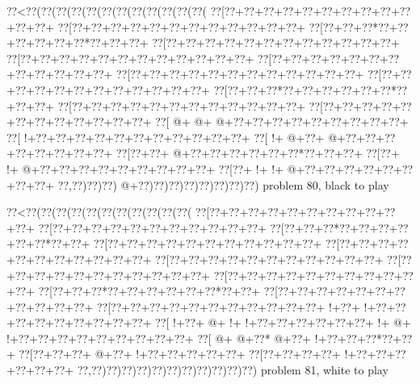 \vbox{\vbox{\goo
\0??<\0??(\0??(\0??(\0??(\0??(\0??(\0??(\0??(\0??(\0??(\0??(\0??(
\0??[\0??+\0??+\0??+\0??+\0??+\0??+\0??+\0??+\0??+\0??+\0??+\0??+
\0??[\0??+\0??+\0??+\0??+\0??+\0??+\0??+\0??+\0??+\0??+\0??+\0??+
\0??[\0??+\0??+\0??*\0??+\0??+\0??+\0??+\0??+\0??*\0??+\0??+\0??+
\0??[\0??+\0??+\0??+\0??+\0??+\0??+\0??+\0??+\0??+\0??+\0??+\0??+
\0??[\0??+\0??+\0??+\0??+\0??+\0??+\0??+\0??+\0??+\0??+\0??+\0??+
\0??[\0??+\0??+\0??+\0??+\0??+\0??+\0??+\0??+\0??+\0??+\0??+\0??+
\0??[\0??+\0??+\0??+\0??+\0??+\0??+\0??+\0??+\0??+\0??+\0??+\0??+
\0??[\0??+\0??+\0??+\0??+\0??+\0??+\0??+\0??+\0??+\0??+\0??+\0??+
\0??[\0??+\0??+\0??*\0??+\0??+\0??+\0??+\0??+\0??*\0??+\0??+\0??+
\0??[\0??+\0??+\0??+\0??+\0??+\0??+\0??+\0??+\0??+\0??+\0??+\0??+
\0??[\0??+\0??+\0??+\0??+\0??+\0??+\0??+\0??+\0??+\0??+\0??+\0??+
\0??[\- @+\- @+\- @+\0??+\0??+\0??+\0??+\0??+\0??+\0??+\0??+\0??+
\0??[\- !+\0??+\0??+\0??+\0??+\0??+\0??+\0??+\0??+\0??+\0??+\0??+
\0??[\- !+\- @+\0??+\- @+\0??+\0??+\0??+\0??+\0??+\0??+\0??+\0??+
\0??[\0??+\0??+\- @+\0??+\0??+\0??+\0??+\0??+\0??*\0??+\0??+\0??+
\0??[\0??+\- !+\- @+\0??+\0??+\0??+\0??+\0??+\0??+\0??+\0??+\0??+
\0??[\0??+\- !+\- !+\- @+\0??+\0??+\0??+\0??+\0??+\0??+\0??+\0??+
\0??,\0??)\0??)\0??)\- @+\0??)\0??)\0??)\0??)\0??)\0??)\0??)\0??)
}
\hfil problem 80, black to play\hfil\break
}

\vbox{\vbox{\goo
\0??<\0??(\0??(\0??(\0??(\0??(\0??(\0??(\0??(\0??(\0??(\0??(
\0??[\0??+\0??+\0??+\0??+\0??+\0??+\0??+\0??+\0??+\0??+\0??+
\0??[\0??+\0??+\0??+\0??+\0??+\0??+\0??+\0??+\0??+\0??+\0??+
\0??[\0??+\0??+\0??*\0??+\0??+\0??+\0??+\0??+\0??*\0??+\0??+
\0??[\0??+\0??+\0??+\0??+\0??+\0??+\0??+\0??+\0??+\0??+\0??+
\0??[\0??+\0??+\0??+\0??+\0??+\0??+\0??+\0??+\0??+\0??+\0??+
\0??[\0??+\0??+\0??+\0??+\0??+\0??+\0??+\0??+\0??+\0??+\0??+
\0??[\0??+\0??+\0??+\0??+\0??+\0??+\0??+\0??+\0??+\0??+\0??+
\0??[\0??+\0??+\0??+\0??+\0??+\0??+\0??+\0??+\0??+\0??+\0??+
\0??[\0??+\0??+\0??*\0??+\0??+\0??+\0??+\0??+\0??*\0??+\0??+
\0??[\0??+\0??+\0??+\0??+\0??+\0??+\0??+\0??+\0??+\0??+\0??+
\0??[\0??+\0??+\0??+\0??+\0??+\0??+\0??+\0??+\0??+\0??+\0??+
\- !+\0??+\- !+\0??+\0??+\0??+\0??+\0??+\0??+\0??+\0??+\0??+
\0??[\- !+\0??+\- @+\- !+\- !+\0??+\0??+\0??+\0??+\0??+\0??+
\- !+\- @+\- !+\0??+\0??+\0??+\0??+\0??+\0??+\0??+\0??+\0??+
\0??[\- @+\- @+\0??*\- @+\0??+\- !+\0??+\0??+\0??*\0??+\0??+
\0??[\0??+\0??+\0??+\- @+\0??+\- !+\0??+\0??+\0??+\0??+\0??+
\0??[\0??+\0??+\0??+\0??+\- !+\0??+\0??+\0??+\0??+\0??+\0??+
\0??,\0??)\0??)\0??)\0??)\0??)\0??)\0??)\0??)\0??)\0??)\0??)
}
\hfil problem 81, white to play\hfil\break
}

